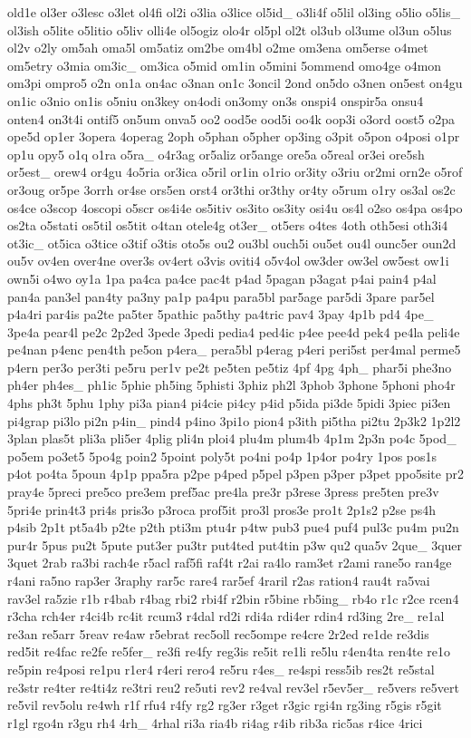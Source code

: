 \begin{DoxyCompactItemize}
old1e ol3er o3lesc o3let ol4fi ol2i o3lia o3lice ol5id\-\_\- o3li4f o5lil ol3ing o5lio o5lis\-\_\- ol3ish o5lite o5litio o5liv olli4e ol5ogiz olo4r ol5pl ol2t ol3ub ol3ume ol3un o5lus ol2v o2ly om5ah oma5l om5atiz om2be om4bl o2me om3ena om5erse o4met om5etry o3mia om3ic\-\_\- om3ica o5mid om1in o5mini 5ommend omo4ge o4mon om3pi ompro5 o2n on1a on4ac o3nan on1c 3oncil 2ond on5do o3nen on5est on4gu on1ic o3nio on1is o5niu on3key on4odi on3omy on3s onspi4 onspir5a onsu4 onten4 on3t4i ontif5 on5um onva5 oo2 ood5e ood5i oo4k oop3i o3ord oost5 o2pa ope5d op1er 3opera 4operag 2oph o5phan o5pher op3ing o3pit o5pon o4posi o1pr op1u opy5 o1q o1ra o5ra\-\_\- o4r3ag or5aliz or5ange ore5a o5real or3ei ore5sh or5est\-\_\- orew4 or4gu 4o5ria or3ica o5ril or1in o1rio or3ity o3riu or2mi orn2e o5rof or3oug or5pe 3orrh or4se ors5en orst4 or3thi or3thy or4ty o5rum o1ry os3al os2c os4ce o3scop 4oscopi o5scr os4i4e os5itiv os3ito os3ity osi4u os4l o2so os4pa os4po os2ta o5stati os5til os5tit o4tan otele4g ot3er\-\_\- ot5ers o4tes 4oth oth5esi oth3i4 ot3ic\-\_\- ot5ica o3tice o3tif o3tis oto5s ou2 ou3bl ouch5i ou5et ou4l ounc5er oun2d ou5v ov4en over4ne over3s ov4ert o3vis oviti4 o5v4ol ow3der ow3el ow5est ow1i own5i o4wo oy1a 1pa pa4ca pa4ce pac4t p4ad 5pagan p3agat p4ai pain4 p4al pan4a pan3el pan4ty pa3ny pa1p pa4pu para5bl par5age par5di 3pare par5el p4a4ri par4is pa2te pa5ter 5pathic pa5thy pa4tric pav4 3pay 4p1b pd4 4pe\-\_\- 3pe4a pear4l pe2c 2p2ed 3pede 3pedi pedia4 ped4ic p4ee pee4d pek4 pe4la peli4e pe4nan p4enc pen4th pe5on p4era\-\_\- pera5bl p4erag p4eri peri5st per4mal perme5 p4ern per3o per3ti pe5ru per1v pe2t pe5ten pe5tiz 4pf 4pg 4ph\-\_\- phar5i phe3no ph4er ph4es\-\_\- ph1ic 5phie ph5ing 5phisti 3phiz ph2l 3phob 3phone 5phoni pho4r 4phs ph3t 5phu 1phy pi3a pian4 pi4cie pi4cy p4id p5ida pi3de 5pidi 3piec pi3en pi4grap pi3lo pi2n p4in\-\_\- pind4 p4ino 3pi1o pion4 p3ith pi5tha pi2tu 2p3k2 1p2l2 3plan plas5t pli3a pli5er 4plig pli4n ploi4 plu4m plum4b 4p1m 2p3n po4c 5pod\-\_\- po5em po3et5 5po4g poin2 5point poly5t po4ni po4p 1p4or po4ry 1pos pos1s p4ot po4ta 5poun 4p1p ppa5ra p2pe p4ped p5pel p3pen p3per p3pet ppo5site pr2 pray4e 5preci pre5co pre3em pref5ac pre4la pre3r p3rese 3press pre5ten pre3v 5pri4e prin4t3 pri4s pris3o p3roca prof5it pro3l pros3e pro1t 2p1s2 p2se ps4h p4sib 2p1t pt5a4b p2te p2th pti3m ptu4r p4tw pub3 pue4 puf4 pul3c pu4m pu2n pur4r 5pus pu2t 5pute put3er pu3tr put4ted put4tin p3w qu2 qua5v 2que\-\_\- 3quer 3quet 2rab ra3bi rach4e r5acl raf5fi raf4t r2ai ra4lo ram3et r2ami rane5o ran4ge r4ani ra5no rap3er 3raphy rar5c rare4 rar5ef 4raril r2as ration4 rau4t ra5vai rav3el ra5zie r1b r4bab r4bag rbi2 rbi4f r2bin r5bine rb5ing\-\_\- rb4o r1c r2ce rcen4 r3cha rch4er r4ci4b rc4it rcum3 r4dal rd2i rdi4a rdi4er rdin4 rd3ing 2re\-\_\- re1al re3an re5arr 5reav re4aw r5ebrat rec5oll rec5ompe re4cre 2r2ed re1de re3dis red5it re4fac re2fe re5fer\-\_\- re3fi re4fy reg3is re5it re1li re5lu r4en4ta ren4te re1o re5pin re4posi re1pu r1er4 r4eri rero4 re5ru r4es\-\_\- re4spi ress5ib res2t re5stal re3str re4ter re4ti4z re3tri reu2 re5uti rev2 re4val rev3el r5ev5er\-\_\- re5vers re5vert re5vil rev5olu re4wh r1f rfu4 r4fy rg2 rg3er r3get r3gic rgi4n rg3ing r5gis r5git r1gl rgo4n r3gu rh4 4rh\-\_\- 4rhal ri3a ria4b ri4ag r4ib rib3a ric5as r4ice 4rici 
\end{DoxyCompactItemize}
